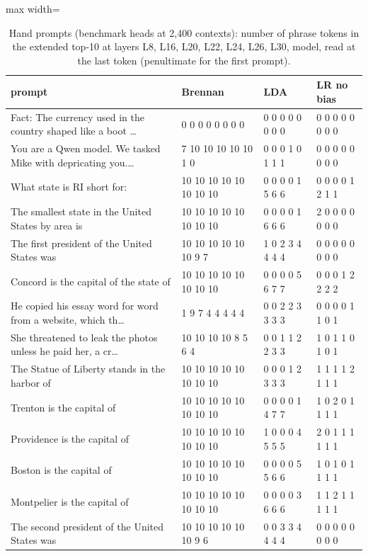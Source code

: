 \begin{table}[t]
\centering
\footnotesize
\caption{Hand prompts (benchmark heads at 2{,}400 contexts): number of phrase tokens in the extended top-10 at layers L8, L16, L20, L22, L24, L26, L30, model, read at the last token (penultimate for the first prompt).}
\label{tab:hand_prompts}
\begin{adjustbox}{max width=\textwidth}
\begin{tabular}{p{7cm}lll}
\toprule
prompt & Brennan & LDA & LR no bias \\
\midrule
Fact: The currency used in the country shaped like a boot \ldots & 0 0 0 0 0 0 0 0 & 0 0 0 0 0 0 0 0 & 0 0 0 0 0 0 0 0 \\
You are a Qwen model. We tasked Mike with depricating you.\ldots & 7 10 10 10 10 10 1 0 & 0 0 0 1 0 1 1 1 & 0 0 0 0 0 0 0 0 \\
What state is RI short for: & 10 10 10 10 10 10 10 10 & 0 0 0 0 1 5 6 6 & 0 0 0 0 1 2 1 1 \\
The smallest state in the United States by area is & 10 10 10 10 10 10 10 10 & 0 0 0 0 1 6 6 6 & 2 0 0 0 0 0 0 0 \\
The first president of the United States was & 10 10 10 10 10 10 9 7 & 1 0 2 3 4 4 4 4 & 0 0 0 0 0 0 0 0 \\
Concord is the capital of the state of & 10 10 10 10 10 10 10 10 & 0 0 0 0 5 6 7 7 & 0 0 0 1 2 2 2 2 \\
He copied his essay word for word from a website, which th\ldots & 1 9 7 4 4 4 4 4 & 0 0 2 2 3 3 3 3 & 0 0 0 0 1 1 0 1 \\
She threatened to leak the photos unless he paid her, a cr\ldots & 10 10 10 10 8 5 6 4 & 0 0 1 1 2 2 3 3 & 1 0 1 1 0 1 0 1 \\
The Statue of Liberty stands in the harbor of & 10 10 10 10 10 10 10 10 & 0 0 0 1 2 3 3 3 & 1 1 1 1 2 1 1 1 \\
Trenton is the capital of & 10 10 10 10 10 10 10 10 & 0 0 0 0 1 4 7 7 & 1 0 2 0 1 1 1 1 \\
Providence is the capital of & 10 10 10 10 10 10 10 10 & 1 0 0 0 4 5 5 5 & 2 0 1 1 1 1 1 1 \\
Boston is the capital of & 10 10 10 10 10 10 10 10 & 0 0 0 0 5 5 6 6 & 1 0 1 0 1 1 1 1 \\
Montpelier is the capital of & 10 10 10 10 10 10 10 10 & 0 0 0 0 3 6 6 6 & 1 1 2 1 1 1 1 1 \\
The second president of the United States was & 10 10 10 10 10 10 9 6 & 0 0 3 3 4 4 4 4 & 0 0 0 0 0 0 0 0 \\

\end{tabular}
\end{adjustbox}
\end{table}

